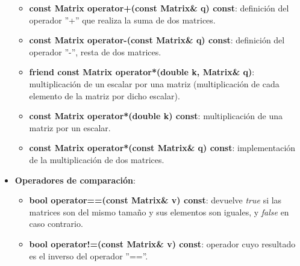 \documentclass[12pt, a4paper]{report}
\begin{document}
\begin{itemize}
\begin{itemize}
\item \textbf{const Matrix operator+(const Matrix\& q) const}: definición del operador ''+'' que realiza la suma de dos matrices.
\item \textbf{const Matrix operator-(const Matrix\& q) const}: definición del operador ''-'', resta de dos matrices.
\item \textbf{friend const Matrix operator*(double k, Matrix\& q)}: multiplicación de un escalar por una matriz (multiplicación de cada elemento de la matriz por dicho escalar).
\item \textbf{const Matrix operator*(double k) const}: multiplicación de una matriz por un escalar.
\item \textbf{const Matrix operator*(const Matrix\& q) const}: implementación de la multiplicación de dos matrices.
\end{itemize}

\item \textbf{Operadores de comparación}:

\begin{itemize}
\item \textbf{bool operator==(const Matrix\& v) const}: devuelve \textit{true} si las matrices son del mismo tamaño y sus elementos son iguales, y \textit{false} en caso contrario.
\item \textbf{bool operator!=(const Matrix\& v) const}: operador cuyo resultado es el inverso del operador ''==''. 
\end{itemize}


\end{itemize}
\end{document}
